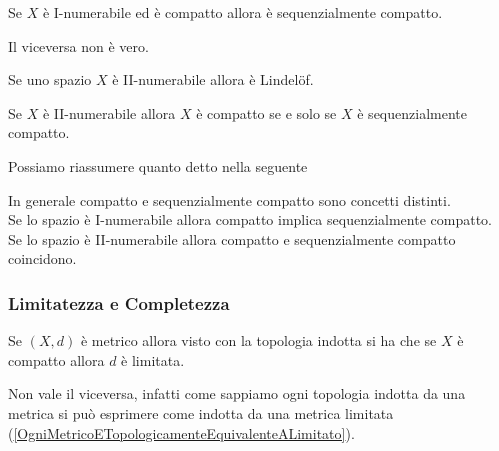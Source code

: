 \begin{multicols*}{2}
\begin{proposition}\label{INumerabileCompattoESequenzialmenteCompatto}
Se $X$ è I-numerabile ed è compatto allora è sequenzialmente compatto.
\end{proposition}
\begin{fact}
Il viceversa non è vero.
\end{fact}

\begin{proposition}\label{IINumerabileImplicaLindelof}
Se uno spazio $X$ è II-numerabile allora è Lindel\"of.
\end{proposition}

\begin{proposition}\label{CompattoESequenzialmenteCompattoCoincidonoInIINumerabile}
Se $X$ è II-numerabile allora $X$ è compatto se e solo se $X$ è sequenzialmente compatto.
\end{proposition}

Possiamo riassumere quanto detto nella seguente
\begin{proposition}\label{CompattezzaEAssiomiDiNumerabilita}
In generale compatto e sequenzialmente compatto sono concetti distinti.\\
Se lo spazio è I-numerabile allora compatto implica sequenzialmente compatto.\\
Se lo spazio è II-numerabile allora compatto e sequenzialmente compatto coincidono.
\end{proposition}

\subsubsection{Limitatezza e Completezza}
\begin{proposition}\label{CompattoInMetricoELimitato}
Se $(X,d)$ è metrico allora visto con la topologia indotta si ha che se $X$ è compatto allora $d$ è limitata.
\end{proposition}
\begin{remark}
Non vale il viceversa, infatti come sappiamo ogni topologia indotta da una metrica si può esprimere come indotta da una metrica limitata (\ref{OgniMetricoETopologicamenteEquivalenteALimitato}).
\end{remark}


\end{multicols*}
